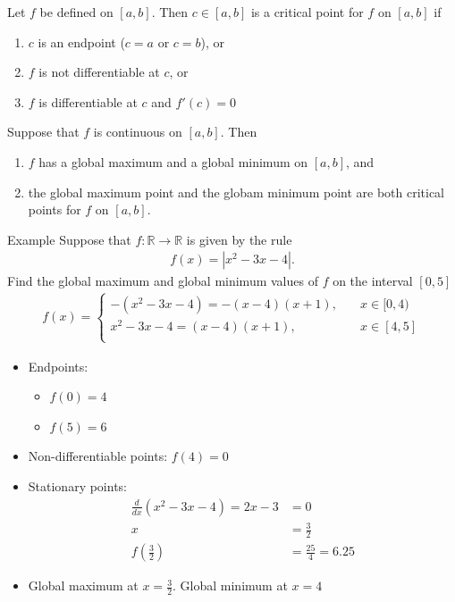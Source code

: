 \documentclass{report}
\begin{document}
	Let $f$ be defined on $[a,b]$. Then $c \in [a,b]$ is a critical point for $f$ on $[a,b]$ if
	\begin{enumerate}
		\item $c$ is an endpoint ($c=a$ or $c=b$), or
		\item $f$ is not differentiable at $c$, or
		\item $f$  is differentiable at $c$ and $f'(c) = 0$
	\end{enumerate}
	Suppose that $f$ is continuous on $[a,b]$. Then
	\begin{enumerate}
		\item $f$ has a global maximum and a global minimum on $[a,b]$, and
		\item the global maximum point and the globam minimum point are both critical points for $f$ on $[a,b]$.
	\end{enumerate}

	\begin{question}{Example}
		Suppose that $f:\mathbb{R} \rightarrow \mathbb{R}$ is given by the rule
		\begin{align*}
			f(x) = |x^2 - 3x - 4|.
		\end{align*}
		Find the global maximum and global minimum values of $f$ on the interval $[0,5]$
		\begin{align*}
			f(x) = \begin{cases}
				-(x^2-3x-4) = -(x-4)(x+1), \quad &x \in [0,4)	\\
				x^2-3x-4 = (x-4)(x+1), \quad &x \in [4,5]	\\
			\end{cases}
		\end{align*}
		\begin{itemize}
			\item Endpoints:
				\begin{itemize}
					\item $f(0) = 4$
					\item $f(5) = 6$
				\end{itemize}
			\item Non-differentiable points: $f(4) = 0$
			\item Stationary points:
				\begin{align*}
					\frac{d}{dx} (x^2 - 3x - 4) = 2x-3 &= 0	\\
												 	 x &= \frac{3}{2}	\\
													 f(\frac{3}{2}) &= \frac{25}{4} = 6.25
				\end{align*}
			\item Global maximum at $x = \frac{3}{2}$. Global minimum at $x=4$
		\end{itemize}
	\end{question}
\end{document}
